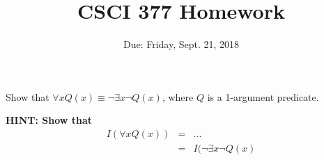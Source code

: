 \documentclass{article}
\title{CSCI 377 Homework}
\date{Due: Friday, Sept. 21, 2018}
\begin{document}
\maketitle


Show that $\forall x Q(x) \equiv \lnot\exists x \lnot Q(x)$, where $Q$ is a 1-argument predicate.


\textbf{HINT: Show that}
\begin{eqnarray*}
I(\forall x Q(x)) &=& ... \\
&=& I(\lnot\exists x \lnot Q(x)
\end{eqnarray*}
\end{document}

